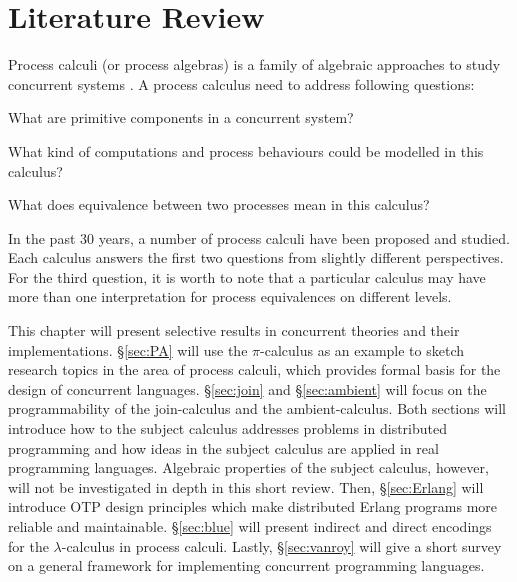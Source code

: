 
\section{Literature Review}

Process calculi (or process algebras) is a family of algebraic approaches to study concurrent systems \cite{historyPA}.  A process calculus need to address following questions:
\begin{inparaenum}[1.]
  \item What are primitive components in a concurrent system?
  \item What kind of computations and process behaviours could be modelled in this calculus?
  \item What does equivalence between two processes mean in this calculus?
\end{inparaenum}
In the past 30 years, a number of process calculi have been proposed and studied.  Each calculus answers the first two questions from slightly different perspectives.  For the third question, it is worth to note that a particular calculus may have more than one interpretation for process equivalences on different levels.

This chapter will present selective results in concurrent theories and their implementations.  \S\ref{sec:PA} will use the $\pi$-calculus as an example to sketch research topics in the area of process calculi, which provides formal basis for the design of concurrent languages.  \S\ref{sec:join} and \S\ref{sec:ambient} will focus on the programmability of the join-calculus and the ambient-calculus.  Both sections will introduce how to the subject calculus addresses problems in distributed programming and how ideas in the subject calculus are applied in real programming languages.  Algebraic properties of the subject calculus, however, will not be investigated in depth in this short review.  Then, \S\ref{sec:Erlang} will introduce OTP design principles which make distributed Erlang programs more reliable and maintainable.  \S\ref{sec:blue} will present indirect and direct encodings for the $\lambda$-calculus in process calculi.  Lastly, \S\ref{sec:vanroy} will give a short survey on a general framework for implementing concurrent programming languages.







